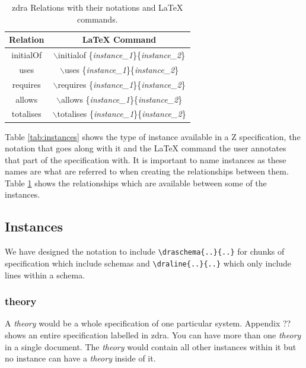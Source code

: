 \begin{table}[H]
\begin{tabular}{| c | c |}
\hline
\textbf{Relation} &  \textbf{\LaTeX{} Command} \\
\hline
initialOf &  $\backslash$initialof
\{\textit{instance\_1}\}\{\textit{instance\_2}\}  \\
\hline
uses & $\backslash$uses \{\textit{instance\_1}\}\{\textit{instance\_2}\}\\
\hline
requires & $\backslash$requires
\{\textit{instance\_1}\}\{\textit{instance\_2}\}\\
\hline
allows & $\backslash$allows \{\textit{instance\_1}\}\{\textit{instance\_2}\}\\
\hline
totalises & $\backslash$totalises
\{\textit{instance\_1}\}\{\textit{instance\_2}\}\\
\hline
\end{tabular}
\caption{\label{tab:relations} \gls{zdra} Relations with their notations and \LaTeX{} commands.}
\end{table}

Table \ref{tab:instances} shows the type of instance available in a Z
specification, the notation that goes along with it and the \LaTeX{} command the
user annotates that part of the specification with. It is important to name
instances as these names are what are referred to when creating the
relationships between them. Table \ref{tab:relations} shows the relationships
which are available between some of the instances. 

\subsection{Instances}

We have designed the notation to include \verb|\draschema{..}{..}| for chunks of
specification which include schemas and \verb|\draline{..}{..}| which only
include lines within a schema.

\subsubsection{theory}

A \emph{theory} would be a whole specification of one particular system.
Appendix ?? shows an entire specification labelled in \gls{zdra}. You can have
more than one \emph{theory} in a single document. The \emph{theory} would
contain all other instances within it but no instance can have a \emph{theory}
inside of it.

